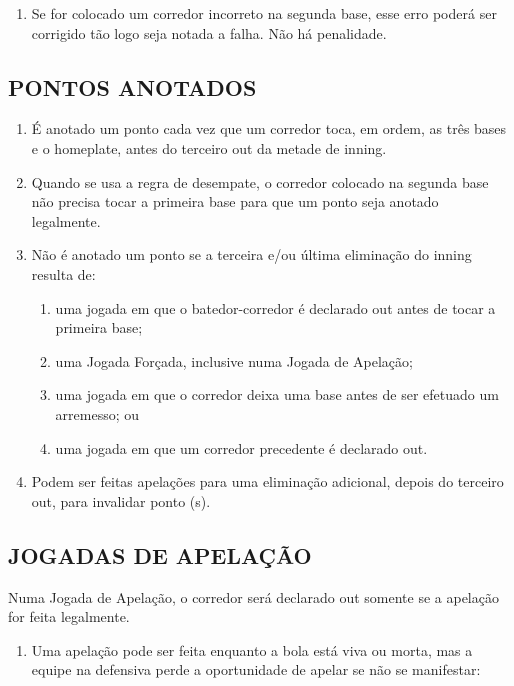 \begin{multicols}{2}
\begin{enumerate}[label=\alph*)]
	\item  Se for colocado um corredor incorreto na segunda base, esse erro poder\'a ser corrigido t\~ao logo seja notada a falha. N\~ao h\'a penalidade. 
\end{enumerate}

\subsection{PONTOS ANOTADOS}

\begin{enumerate}[label=\alph*)]
	\item \'E anotado um ponto cada vez que um corredor toca, em ordem, as tr\^es bases e o \gls{homeplate}, antes do terceiro \gls{out} da metade de \gls{inning}. 

	\item  Quando se usa a regra de desempate, o corredor colocado na segunda base n\~ao precisa tocar a primeira base para que um ponto seja anotado legalmente. 

	\item  N\~ao \'e anotado um ponto se a terceira e/ou \'ultima elimina\c{c}\~ao do \gls{inning} resulta de: 
		\begin{enumerate}[label=\roman* -]
			\item uma jogada em que o batedor-corredor \'e declarado \gls{out} antes de tocar a primeira base; 
			\item uma Jogada For\c{c}ada, inclusive numa Jogada de Apela\c{c}\~ao; 
			\item uma jogada em que o corredor deixa uma base antes de ser efetuado um arremesso; ou 
			\item uma jogada em que um corredor precedente \'e declarado \gls{out}.
		\end{enumerate}
	\item Podem ser feitas apela\c{c}\~oes para uma elimina\c{c}\~ao adicional, depois do terceiro \gls{out}, para invalidar ponto (s). 
	
\end{enumerate}

\subsection{JOGADAS DE APELA\c{C}\~AO}
Numa Jogada de Apela\c{c}\~ao, o corredor ser\'a declarado \gls{out} somente se a apela\c{c}\~ao for feita legalmente. 

\begin{enumerate}[label=\alph*)]
	\item Uma apela\c{c}\~ao pode ser feita enquanto a bola est\'a viva ou morta, mas a equipe na defensiva perde a oportunidade de apelar se n\~ao se manifestar: 
	

\end{enumerate}
\end{multicols}
